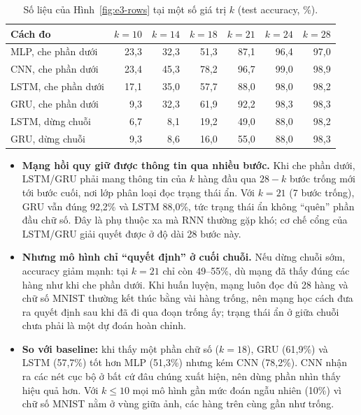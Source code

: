\documentclass[12pt]{article}
\newcommand{\st}[1]{\textbf{#1}}
\begin{document}
\begin{table}[H]
\centering
\caption{Số liệu của Hình~\ref{fig:e3-rows} tại một số giá trị $k$ (test accuracy, \%).}\label{tab:e3-rows}
\begin{tabularx}{\linewidth}{@{}Lrrrrrr@{}}
\toprule
Cách đo & $k=10$ & $k=14$ & $k=18$ & $k=21$ & $k=24$ & $k=28$ \\\midrule
MLP, che phần dưới & 23,3 & 32,3 & 51,3 & 87,1 & 96,4 & 97,0 \\
CNN, che phần dưới & 23,4 & 45,3 & 78,2 & 96,7 & 99,0 & 98,9 \\
LSTM, che phần dưới & 17,1 & 35,0 & 57,7 & 88,0 & 98,0 & 98,2 \\
GRU, che phần dưới & 9,3 & 32,3 & 61,9 & 92,2 & 98,3 & 98,3 \\
LSTM, dừng chuỗi & 6,7 & 8,1 & 19,2 & 49,0 & 88,0 & 98,2 \\
GRU, dừng chuỗi & 9,3 & 8,6 & 16,0 & 55,0 & 88,0 & 98,3 \\
\bottomrule
\end{tabularx}
\end{table}

\begin{itemize}
  \item \st{Mạng hồi quy giữ được thông tin qua nhiều bước.} Khi che phần dưới, LSTM/GRU phải mang thông tin của $k$ hàng đầu
        qua $28-k$ bước trống mới tới bước cuối, nơi lớp phân loại đọc trạng thái ẩn. Với $k=21$ (7 bước trống), GRU vẫn đúng
        92,2\% và LSTM 88,0\%, tức trạng thái ẩn không ``quên'' phần đầu chữ số. Đây là phụ thuộc xa mà RNN thường gặp khó; cơ
        chế cổng của LSTM/GRU giải quyết được ở độ dài 28 bước này.
  \item \st{Nhưng mô hình chỉ ``quyết định'' ở cuối chuỗi.} Nếu dừng chuỗi sớm, accuracy giảm mạnh: tại $k=21$ chỉ còn 49--55\%,
        dù mạng đã thấy đúng các hàng như khi che phần dưới. Khi huấn luyện, mạng luôn đọc đủ 28 hàng và chữ số MNIST thường
        kết thúc bằng vài hàng trống, nên mạng học cách đưa ra quyết định sau khi đã đi qua đoạn trống ấy; trạng thái ẩn ở
        giữa chuỗi chưa phải là một dự đoán hoàn chỉnh.
  \item \st{So với baseline:} khi thấy một phần chữ số ($k=18$), GRU (61,9\%) và LSTM (57,7\%) tốt hơn MLP (51,3\%) nhưng kém
        CNN (78,2\%). CNN nhận ra các nét cục bộ ở bất cứ đâu chúng xuất hiện, nên dùng phần nhìn thấy hiệu quả hơn. Với $k \le 10$
        mọi mô hình gần mức đoán ngẫu nhiên (10\%) vì chữ số MNIST nằm ở vùng giữa ảnh, các hàng trên cùng gần như trống.
\end{itemize}
\end{document}
